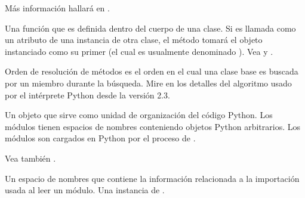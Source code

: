 \documentclass[a4,10pt,spanish]{sphinxmanual}
\begin{document}
\begin{description}
\sphinxAtStartPar
Más información hallará en .

\item[{método\index{método@\spxentry{método}|spxpagem}\phantomsection\label{\detokenize{glossary:term-method}}}] \leavevmode
\sphinxAtStartPar
Una función que es definida dentro del cuerpo de una clase.  Si es llamada como un atributo de una instancia de otra clase, el método tomará el objeto instanciado como su primer {\hyperref[\detokenize{glossary:term-argument}]{}} (el cual es usualmente denominado ). Vea {\hyperref[\detokenize{glossary:term-function}]{}} y {\hyperref[\detokenize{glossary:term-nested-scope}]{}}.

\item[{orden de resolución de métodos\index{orden de resolución de métodos@\spxentry{orden de resolución de métodos}|spxpagem}\phantomsection\label{\detokenize{glossary:term-method-resolution-order}}}] \leavevmode
\sphinxAtStartPar
Orden de resolución de métodos es el orden en el cual una clase base es buscada por un miembro durante la búsqueda. Mire en  los detalles del algoritmo usado por el intérprete Python desde la versión 2.3.

\item[{módulo\index{módulo@\spxentry{módulo}|spxpagem}\phantomsection\label{\detokenize{glossary:term-module}}}] \leavevmode
\sphinxAtStartPar
Un objeto que sirve como unidad de organización del código Python.  Los módulos tienen espacios de nombres conteniendo objetos Python arbitrarios.  Los módulos son cargados en Python por el proceso de {\hyperref[\detokenize{glossary:term-importing}]{}}.

\sphinxAtStartPar
Vea también {\hyperref[\detokenize{glossary:term-package}]{}}.

\item[{especificador de módulo\index{especificador de módulo@\spxentry{especificador de módulo}|spxpagem}\phantomsection\label{\detokenize{glossary:term-module-spec}}}] \leavevmode
\sphinxAtStartPar
Un espacio de nombres que contiene la información relacionada a la importación usada al leer un módulo.  Una instancia de  .


\end{description}
\end{document}
